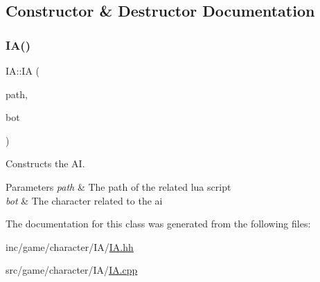 \subsection{Constructor \& Destructor Documentation}
\mbox{\label{classIA_a0733aa0c9dd00b142f8b474fc3b0b714}} 
\subsubsection{\texorpdfstring{I\+A()}{IA()}}
{\footnotesize\ttfamily I\+A\+::\+IA (\begin{DoxyParamCaption}\item[{std\+::string const}]{path,  }\item[{A\+Character $\ast$}]{bot }\end{DoxyParamCaption})}



Constructs the AI. 


\begin{DoxyParams}{Parameters}
{\em path} & The path of the related lua script \\
\hline
{\em bot} & The character related to the ai \\
\hline
\end{DoxyParams}


The documentation for this class was generated from the following files\+:\begin{DoxyCompactItemize}
\item 
inc/game/character/\+I\+A/\hyperlink{IA_8hh}{I\+A.\+hh}\item 
src/game/character/\+I\+A/\hyperlink{IA_8cpp}{I\+A.\+cpp}\end{DoxyCompactItemize}
